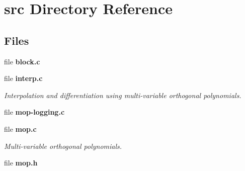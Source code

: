 \section{src Directory Reference}
\label{dir_68267d1309a1af8e8297ef4c3efbcdba}
\subsection*{Files}
\begin{DoxyCompactItemize}
\item 
file {\bfseries block.\+c}
\item 
file {\bf interp.\+c}
\begin{DoxyCompactList}\small\item\em Interpolation and differentiation using multi-\/variable orthogonal polynomials. \end{DoxyCompactList}\item 
file {\bfseries mop-\/logging.\+c}
\item 
file {\bf mop.\+c}
\begin{DoxyCompactList}\small\item\em Multi-\/variable orthogonal polynomials. \end{DoxyCompactList}\item 
file {\bfseries mop.\+h}
\end{DoxyCompactItemize}

